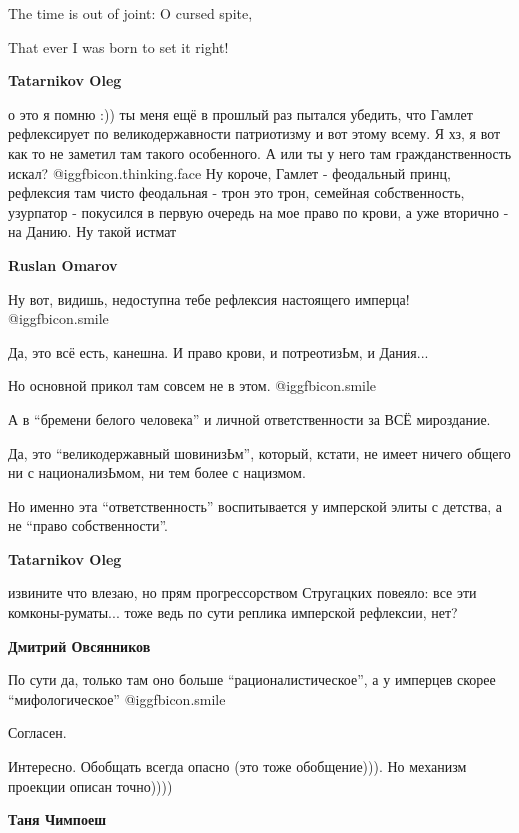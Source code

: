 \begin{itemize}
\begin{itemize}
The time is out of joint: O cursed spite,

That ever I was born to set it right!

\textbf{Tatarnikov Oleg} 

о это я помню :)) ты меня ещё в прошлый раз пытался убедить, что Гамлет
рефлексирует по великодержавности патриотизму и вот этому всему. Я хз, я вот
как то не заметил там такого особенного. А или ты у него там гражданственность
искал?  @igg{fbicon.thinking.face}  Ну короче, Гамлет - феодальный принц,
рефлексия там чисто феодальная - трон это трон, семейная собственность,
узурпатор - покусился в первую очередь на мое право по крови, а уже вторично -
на Данию. Ну такой истмат

\textbf{Ruslan Omarov} 

Ну вот, видишь, недоступна тебе рефлексия настоящего имперца!  @igg{fbicon.smile} 

Да, это всё есть, канешна. И право крови, и потреотизЬм, и Дания...

Но основной прикол там совсем не в этом.  @igg{fbicon.smile} 

А в \enquote{бремени белого человека} и личной ответственности за ВСЁ мироздание.

Да, это \enquote{великодержавный шовинизЬм}, который, кстати, не имеет ничего общего ни
с национализЬмом, ни тем более с нацизмом.

Но именно эта \enquote{ответственность} воспитывается у имперской элиты с детства, а не
\enquote{право собственности}.

\textbf{Tatarnikov Oleg} 

извините что влезаю, но прям прогрессорством Стругацких повеяло: все эти
комконы-руматы... тоже ведь по сути реплика имперской рефлексии, нет?

\textbf{Дмитрий Овсянников} 

По сути да, только там оно больше \enquote{рационалистическое}, а у имперцев скорее
\enquote{мифологическое}  @igg{fbicon.smile} 

\end{itemize} %

Согласен.


Интересно. Обобщать всегда опасно (это тоже обобщение))). Но механизм проекции
описан точно))))

\textbf{Таня Чимпоеш} 


\end{itemize}
